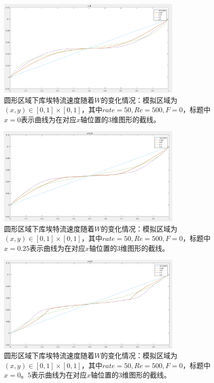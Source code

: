 \documentclass[11pt,UTF8]{ctexart}
\begin{document}
    \begin{figure}[h]
        \centerline{\includegraphics[width=0.8\textwidth]{Cu_W_x=0.png}}
        \caption{圆形区域下库埃特流速度随着$W$的变化情况：模拟区域为$(x,y)\in [0,1]\times [0,1]$，其中$rate=50,Re=500,F=0$，标题中$x=0$表示曲线为在对应$x$轴位置的3维图形的截线。}
        \label{img11}
    \end{figure}
    \begin{figure}[h]
        \centerline{\includegraphics[width=0.8\textwidth]{Cu_W_x=0_25.png}}
        \caption{圆形区域下库埃特流速度随着$W$的变化情况：模拟区域为$(x,y)\in [0,1]\times [0,1]$，其中$rate=50,Re=500,F=0$，标题中$x=0.25$表示曲线为在对应$x$轴位置的3维图形的截线。}
        \label{img12}
    \end{figure}
    \begin{figure}[h]
        \centerline{\includegraphics[width=0.8\textwidth]{Cu_W_x=0_5.png}}
        \caption{圆形区域下库埃特流速度随着$W$的变化情况：模拟区域为$(x,y)\in [0,1]\times [0,1]$，其中$rate=50,Re=500,F=0$，标题中$x=0。5$表示曲线为在对应$x$轴位置的3维图形的截线。}
        \label{img13}
    \end{figure}
\end{document}
